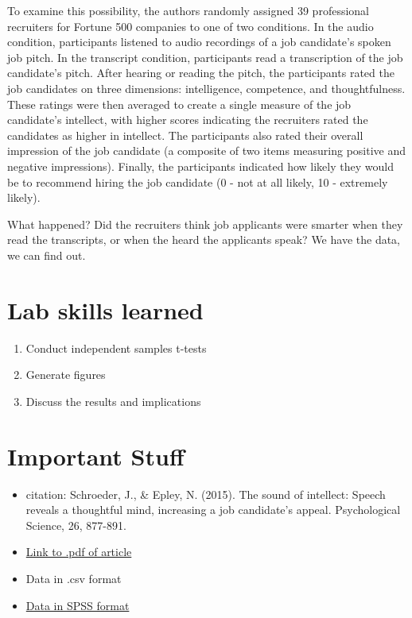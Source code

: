 \documentclass[
]{book}
\providecommand{\tightlist}{%
  \setlength{\itemsep}{0pt}\setlength{\parskip}{0pt}}
\begin{document}
To examine this possibility, the authors randomly assigned 39 professional recruiters for Fortune 500 companies to one of two conditions. In the audio condition, participants listened to audio recordings of a job candidate's spoken job pitch. In the transcript condition, participants read a transcription of the job candidate's pitch. After hearing or reading the pitch, the participants rated the job candidates on three dimensions: intelligence, competence, and thoughtfulness. These ratings were then averaged to create a single measure of the job candidate's intellect, with higher scores indicating the recruiters rated the candidates as higher in intellect. The participants also rated their overall impression of the job candidate (a composite of two items measuring positive and negative impressions). Finally, the participants indicated how likely they would be to recommend hiring the job candidate (0 - not at all likely, 10 - extremely likely).

What happened? Did the recruiters think job applicants were smarter when they read the transcripts, or when the heard the applicants speak? We have the data, we can find out.

\hypertarget{lab-skills-learned-1}{%
\section{Lab skills learned}\label{lab-skills-learned-1}}

\begin{enumerate}
\def\labelenumi{\arabic{enumi}.}
\tightlist
\item
  Conduct independent samples t-tests
\item
  Generate figures
\item
  Discuss the results and implications
\end{enumerate}

\hypertarget{important-stuff-1}{%
\section{Important Stuff}\label{important-stuff-1}}

\begin{itemize}
\tightlist
\item
  citation: Schroeder, J., \& Epley, N. (2015). The sound of intellect: Speech reveals a thoughtful mind, increasing a job candidate's appeal. Psychological Science, 26, 877-891.
\item
  \href{http://journals.sagepub.com/stoken/default+domain/PhtK6MPtXvkgnYRrnGbA/full}{Link to .pdf of article}
\item
  Data in .csv format
\item
  \href{https://drive.google.com/open?id=0Bz-rhZ21ShvOVXlDMjEzQU1oY1k}{Data in SPSS format}
\end{itemize}
\end{document}
